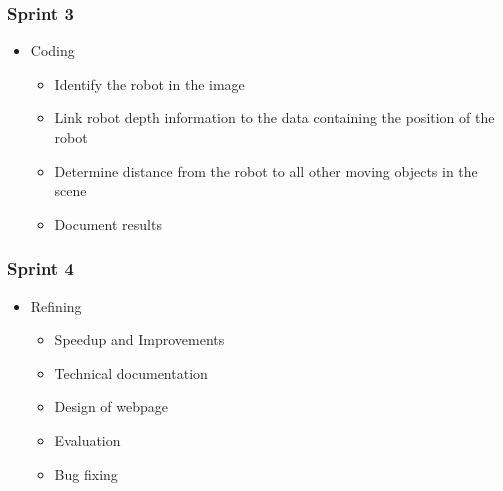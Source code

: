 \documentclass[10pt,a4paper]{article}
\begin{document}
\subsubsection*{Sprint 3}
\begin{itemize}
\item Coding
\begin{itemize}
\item Identify the robot in the image
\item Link robot depth information to the data containing the position of the robot
\item Determine distance from the robot to all other moving objects in the scene
\item Document results
\end{itemize}
\end{itemize}
\subsubsection*{Sprint 4}
\begin{itemize}
\item Refining
\begin{itemize}
\item Speedup and Improvements
\item Technical documentation
\item Design of webpage
\item Evaluation
\item Bug fixing
\end{itemize}
\end{itemize}
\end{document}
